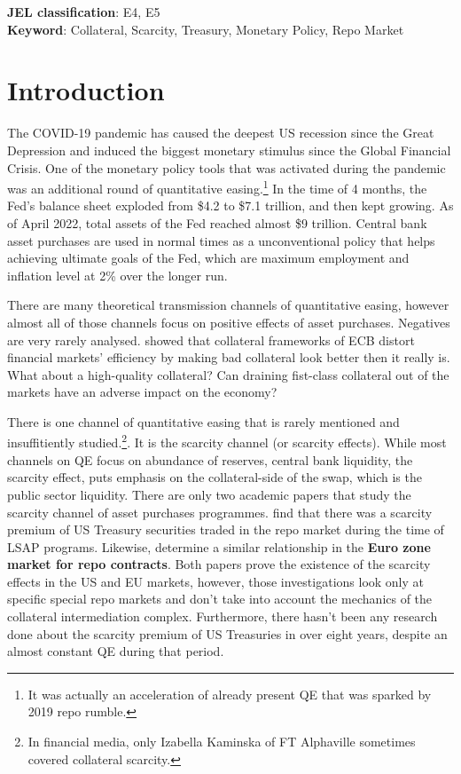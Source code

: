 \documentclass[11pt,a4paper,english,oneside]{article}
\begin{document}
\abstract{\lipsum[1]}

\begin{flushleft}
  \textbf{JEL classification}: E4, E5\\
  \textbf{Keyword}: Collateral, Scarcity, Treasury, Monetary Policy, Repo Market
\end{flushleft}

\section{Introduction}

The COVID-19 pandemic has caused the deepest US recession since the Great Depression and induced the biggest monetary stimulus since the Global Financial Crisis. One of the monetary policy tools that was activated during the pandemic was an additional round of quantitative easing.\footnote{It was actually an acceleration of already present QE that was sparked by 2019 repo rumble.} In the time of 4 months, the Fed's balance sheet exploded from \$4.2 to \$7.1 trillion, and then kept growing. As of April 2022, total assets of the Fed reached almost \$9 trillion. Central bank asset purchases are used in normal times as a unconventional policy that helps achieving ultimate goals of the Fed, which are maximum employment and inflation level at 2\% over the longer run.

There are many theoretical transmission channels of quantitative easing, however almost all of those channels focus on positive effects of asset purchases. Negatives are very rarely analysed. \citet{nyborg2015} showed that collateral frameworks of ECB distort financial markets' efficiency by making bad collateral look better then it really is. What about a high-quality collateral? Can draining fist-class collateral out of the markets have an adverse impact on the economy?

There is one channel of quantitative easing that is rarely mentioned and insuffitiently studied.\footnote{In financial media, only Izabella Kaminska of FT Alphaville sometimes covered collateral scarcity.}. It is the scarcity channel (or scarcity effects). While most channels on QE focus on abundance of reserves, central bank liquidity, the scarcity effect, puts emphasis on the collateral-side of the swap, which is the public sector liquidity. There are only two academic papers that study the scarcity channel of asset purchases programmes. \citet{damico2014} find that there was a scarcity premium of US Treasury securities traded in the repo market during the time of LSAP programs. Likewise, \citet{arrata2018} determine a similar relationship in the \textbf{Euro zone market for repo contracts}. Both papers prove the existence of the scarcity effects in the US and EU markets, however, those investigations look only at specific special repo markets and don't take into account the mechanics of the collateral intermediation complex. Furthermore, there hasn't been any research done about the scarcity premium of US Treasuries in over eight years, despite an almost constant QE during that period.
\end{document}
